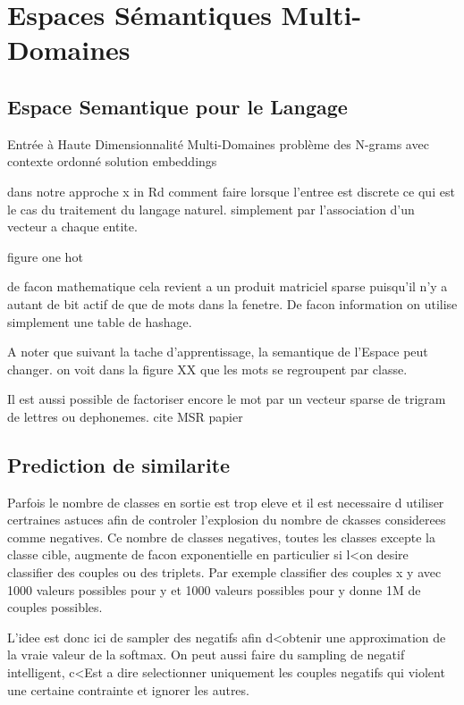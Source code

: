 \chapter{Espaces Sémantiques Multi-Domaines}



\section{Espace Semantique pour le Langage}

Entrée à Haute Dimensionnalité
Multi-Domaines
problème des N-grams avec contexte ordonné
solution embeddings

dans notre approche x in Rd
comment faire lorsque l'entree est discrete ce qui est le cas du traitement du langage naturel. simplement par l'association d'un vecteur a chaque entite.

figure one hot

de facon mathematique cela revient a un produit matriciel sparse puisqu'il n'y a autant de bit actif de que de mots dans la fenetre. De facon information on utilise simplement une table de hashage.

A noter que suivant la tache d'apprentissage, la semantique de l'Espace peut changer. on voit dans la figure XX que les mots se regroupent par classe. 

Il est aussi possible de factoriser encore le mot par un vecteur sparse de trigram de lettres ou dephonemes. cite MSR papier

\section{Prediction de similarite}

Parfois le nombre de classes en sortie est trop eleve et il est necessaire d
utiliser certraines astuces afin de controler l'explosion du nombre de ckasses
considerees comme negatives. Ce nombre de classes negatives, toutes les classes
excepte la classe cible, augmente de facon exponentielle en particulier si l<on
desire classifier des couples ou des triplets. Par exemple classifier des
couples x y avec 1000 valeurs possibles pour y et 1000 valeurs possibles pour y
donne 1M de couples possibles.

L'idee est donc ici de sampler des negatifs afin d<obtenir une approximation de
la vraie valeur de la softmax.  On peut aussi faire du sampling de negatif
intelligent, c<Est a dire selectionner uniquement les couples negatifs qui
violent une certaine contrainte et ignorer les autres.

